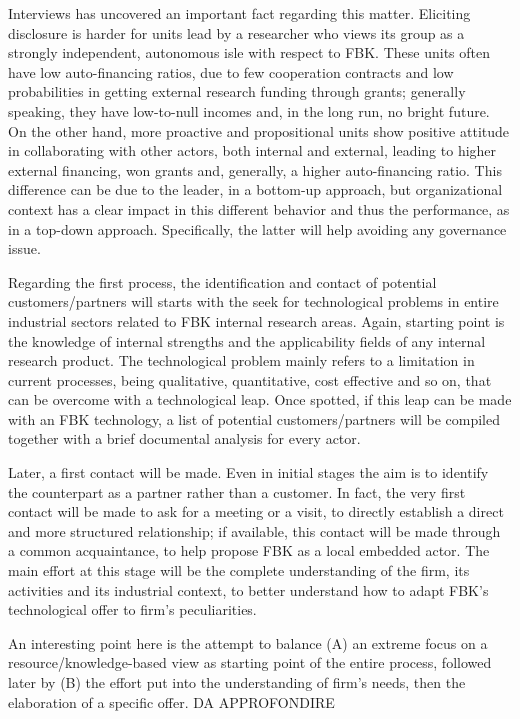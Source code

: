 Interviews has uncovered an important fact regarding this matter. Eliciting disclosure is harder for units lead by a researcher who views its group as a strongly independent, autonomous isle with respect to FBK. These units often have low auto-financing ratios, due to few cooperation contracts and low probabilities in getting external research funding through grants; generally speaking, they have low-to-null incomes and, in the long run, no bright future. On the other hand, more proactive and propositional units show positive attitude in collaborating with other actors, both internal and external, leading to higher external financing, won grants and, generally, a higher auto-financing ratio. This difference can be due to the leader, in a bottom-up approach, but organizational context has a clear impact in this different behavior and thus the performance, as in a top-down approach. Specifically, the latter will help avoiding any governance issue.

Regarding the first process, the identification and contact of potential customers/partners will starts with the seek for technological problems in entire industrial sectors related to FBK internal research areas. Again, starting point is the knowledge of internal strengths and the applicability fields of any internal research product. The technological problem mainly refers to a limitation in current processes, being qualitative, quantitative, cost effective and so on, that can be overcome with a technological leap. Once spotted, if this leap can be made with an FBK technology, a list of potential customers/partners will be compiled together with a brief documental analysis for every actor. 

Later, a first contact will be made. Even in initial stages the aim is to identify the counterpart as a partner rather than a customer. In fact, the very first contact will be made to ask for a meeting or a visit, to directly establish a direct and more structured relationship; if available, this contact will be made through a common acquaintance, to help propose FBK as a local embedded actor. The main effort at this stage will be the complete understanding of the firm, its activities and its industrial context, to better understand how to adapt FBK’s technological offer to firm’s peculiarities. 

An interesting point here is the attempt to balance (A) an extreme focus on a resource/knowledge-based view as starting point of the entire process, followed later by (B) the effort put into the understanding of firm’s needs, then the elaboration of a specific offer. DA APPROFONDIRE 

